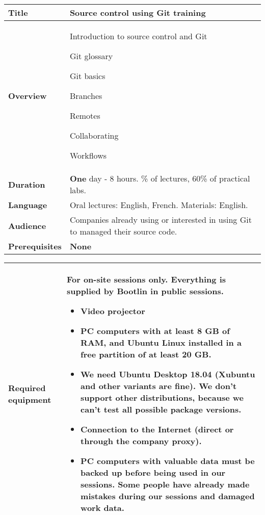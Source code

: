 \documentclass[a4paper,12pt,obeyspaces,spaces,hyphens]{article}
\begin{document}
\setlength{\arrayrulewidth}{0.8pt}

\feshowtitle

\small
{}

 {
  \begin{tabularx}{\textwidth}{|g|h|}
    {\bf Title} & {\bf Source control using Git training} \\
    \hline

    {\bf Overview} &
    Introduction to source control and Git \par
    Git glossary\par
    Git basics\par
    Branches\par
    Remotes\par
    Collaborating\par
    Workflows\par
    \\
    \hline

    {\bf Duration} & {\bf One} day - 8 hours.
    \% of lectures, 60\% of practical labs. \\
    \hline

    {\bf Language} & Oral lectures: English, French.
    \newline Materials: English.\\
    \hline

    {\bf Audience} & Companies already using or interested in using
    Git to managed their source code.\\
    \hline

    {\bf Prerequisites} & {\bf None}\\
    \hline
  \end{tabularx}

  \begin{tabularx}{\textwidth}{|g|h|}
    {\bf Required equipment} &
    {\bf For on-site sessions only.}
    \newline Everything is supplied by Bootlin in public
    sessions.
    \begin{itemize}
    \item Video projector
    \item PC computers with at least 8 GB of RAM, and Ubuntu Linux
    installed in a {\bf free partition of at least 20 GB}.
    \item We need Ubuntu Desktop 18.04 (Xubuntu and
    other variants are fine). We don't support other
    distributions, because we can't test all possible package versions.
    \item {\bf Connection to the Internet} (direct or through the
    company proxy).
    \item {\bf PC computers with valuable data must be backed up}
    before being used in our sessions.  Some people have already made
    mistakes during our sessions and damaged work data.
    \end{itemize}\\
    \hline


\end{tabularx}}
\end{document}
